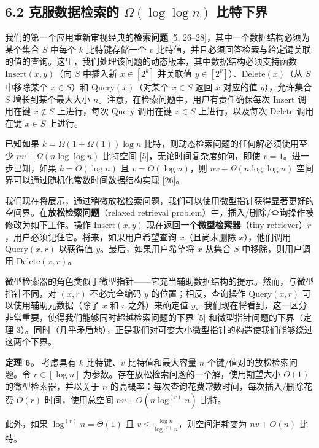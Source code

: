 \documentclass[12pt,a4paper]{ctexart}
\theoremstyle{remark}
\begin{document}
\subsection{6.2 克服数据检索的 $\Omega(\log\log n)$ 比特下界}
我们的第一个应用重新审视经典的\textbf{检索问题} [5, 26–28]，其中一个数据结构必须为某个集合 $S$ 中每个 $k$ 比特键存储一个 $v$ 比特值，并且必须回答检索与给定键关联的值的查询。这里，我们处理该问题的动态版本，其中数据结构必须支持函数 $\text{Insert}(x,y)$（向 $S$ 中插入新 $x\in[2^k]$ 并关联值 $y\in[2^v]$）、$\text{Delete}(x)$（从 $S$ 中移除某个 $x\in S$）和 $\text{Query}(x)$（对某个 $x\in S$ 返回 $x$ 对应的值 $y$），允许集合 $S$ 增长到某个最大大小 $n$。注意，在检索问题中，用户有责任确保每次 $\text{Insert}$ 调用在键 $x\notin S$ 上进行，每次 $\text{Query}$ 调用在键 $x\in S$ 上进行，以及每次 $\text{Delete}$ 调用在键 $x\in S$ 上进行。

已知如果 $k=\Omega(1+\Omega(1))\log n$ 比特，则动态检索问题的任何解必须使用至少 $nv+\Omega(n\log\log n)$ 比特空间 [5]，无论时间复杂度如何，即使 $v=1$。进一步已知，如果 $k=\Theta(\log n)$ 且 $v=O(\log n)$，则 $nv+\Omega(n\log\log n)$ 空间界可以通过随机化常数时间数据结构实现 [26]。

我们现在将展示，通过稍微放松检索问题，我们可以使用微型指针获得显著更好的空间界。在\textbf{放松检索问题}（relaxed retrieval problem）中，插入/删除/查询操作被修改为如下工作。操作 $\text{Insert}(x,y)$ 现在返回一个\textbf{微型检索器}（tiny retriever）$r$，用户必须记住它。将来，如果用户希望查询 $x$（且尚未删除 $x$），他们调用 $\text{Query}(x,r)$ 以获得值 $y$。最后，如果用户希望将 $x$ 从集合 $S$ 中移除，则用户调用 $\text{Delete}(x,r)$。

微型检索器的角色类似于微型指针——它充当辅助数据结构的提示。然而，与微型指针不同，对 $(x,r)$ 不必完全编码 $y$ 的位置；相反，查询操作 $\text{Query}(x,r)$ 可以使用辅助元数据（除了 $x$ 和 $r$ 之外）来确定值 $y$。我们现在将看到，这一区分非常重要，使得我们能够同时超越检索问题的下界 [5] 和微型指针问题的下界（定理 3）。同时（几乎矛盾地），正是我们对可变大小微型指针的构造使我们能够绕过这两个下界。

\textbf{定理 6。} 考虑具有 $k$ 比特键、$v$ 比特值和最大容量 $n$ 个键/值对的放松检索问题。令 $r\in[\log n]$ 为参数。存在放松检索问题的一个解，使用期望大小 $O(1)$ 的微型检索器，并以关于 $n$ 的高概率：每次查询花费常数时间，每次插入/删除花费 $O(r)$ 时间，使用总空间 $nv+O(n\log^{(r)}n)$ 比特。

此外，如果 $\log^{(r)}n=\Theta(1)$ 且 $v\leq\frac{\log n}{\log^{(r)}n}$，则空间消耗变为 $nv+O(n)$ 比特。
\end{document}
